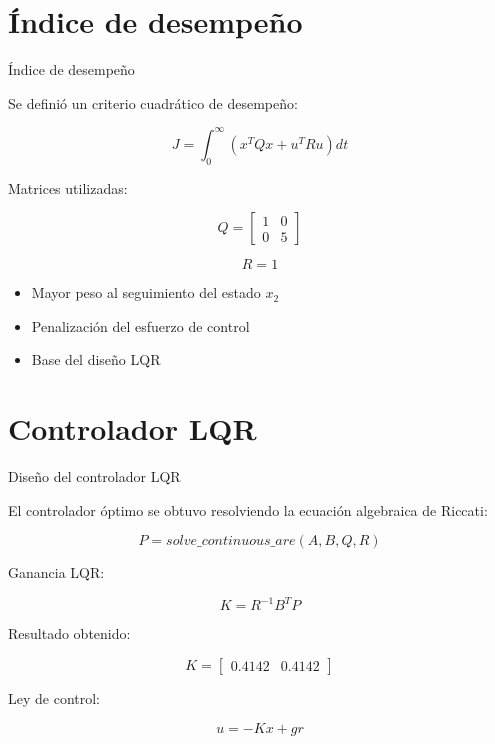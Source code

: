 \documentclass[aspectratio=169]{beamer}
\begin{document}
\section{Índice de desempeño}

\begin{frame}{Índice de desempeño}

Se definió un criterio cuadrático de desempeño:

\[
J = \int_{0}^{\infty}
\left(
x^TQx + u^TRu
\right)dt
\]

\vspace{0.5cm}

Matrices utilizadas:

\[
Q=
\begin{bmatrix}
1 & 0 \\
0 & 5
\end{bmatrix}
\]

\vspace{0.3cm}

\[
R = 1
\]

\vspace{0.5cm}

\begin{itemize}
\item Mayor peso al seguimiento del estado \(x_2\)
\item Penalización del esfuerzo de control
\item Base del diseño LQR
\end{itemize}

\end{frame}

\section{Controlador LQR}

\begin{frame}{Diseño del controlador LQR}

El controlador óptimo se obtuvo resolviendo la ecuación algebraica de Riccati:

\[
P = solve\_continuous\_are(A,B,Q,R)
\]

\vspace{0.4cm}

Ganancia LQR:

\[
K = R^{-1}B^TP
\]

\vspace{0.4cm}

Resultado obtenido:

\[
K=
\begin{bmatrix}
0.4142 & 0.4142
\end{bmatrix}
\]

\vspace{0.4cm}

Ley de control:

\[
u=-Kx+gr
\]

\end{frame}
\end{document}
